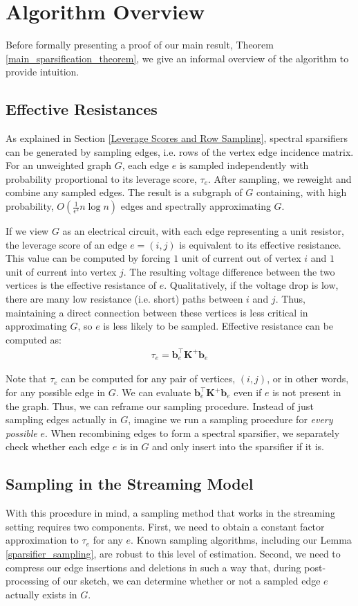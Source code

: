 \documentclass[11pt]{article}
\newcommand{\bv}[1]{\mathbf{#1}}
\begin{document}
\section{Algorithm Overview}\label{algorithm_overview}
Before formally presenting a proof of our main result, Theorem \ref{main_sparsification_theorem}, we give an informal overview of the algorithm to provide intuition. 

\subsection{Effective Resistances}
As explained in Section \ref{Leverage Scores and Row Sampling}, spectral sparsifiers can be generated by sampling edges, i.e. rows of the vertex edge incidence matrix. For an unweighted graph $G$, each edge $e$ is sampled independently with probability proportional to its leverage score, $\tau_e$. After sampling, we reweight and combine any sampled edges. The result is a subgraph of $G$ containing, with high probability, $O(\frac1{\epsilon^2}n\log n)$ edges and spectrally approximating $G$.

If we view $G$ as an electrical circuit, with each edge representing a unit resistor, the leverage score of an edge $e=(i,j)$ is equivalent  to its effective resistance. This value can be computed by forcing $1$ unit of current out of vertex $i$ and $1$ unit of current into vertex $j$. The resulting voltage difference between the two vertices is the effective resistance of $e$. Qualitatively, if the voltage drop is low, there are many low resistance (i.e. short) paths between $i$ and $j$. Thus, maintaining a direct connection between these vertices is less critical in approximating $G$, so $e$ is less likely to be sampled.
Effective resistance can be computed as:
\begin{align*}
\tau_e = \bv{b}_e^\top \bv{K}^+\bv{b}_e
\end{align*}


Note that $\tau_e$ can be computed for any pair of vertices, $(i,j)$, or in other words, for any possible edge in $G$. We can evaluate  $\bv{b}_e^\top \bv{K}^+\bv{b}_e$ even if $e$ is not present in the graph. Thus, we can reframe our sampling procedure. Instead of just sampling edges actually in $G$, imagine we run a sampling procedure for \emph{every possible} $e$. When recombining edges to form a spectral sparsifier, we separately check whether each edge $e$ is in $G$ and only insert into the sparsifier if it is. 
\subsection{Sampling in the Streaming Model}
With this procedure in mind, a sampling method that works in the streaming setting requires two components. First, we need to obtain a constant factor approximation to $\tau_e$ for any $e$. Known sampling algorithms, including our Lemma \ref{sparsifier_sampling}, are robust to this level of estimation. Second, we need to compress our edge insertions and deletions in such a way that, during post-processing of our sketch, we can determine whether or not a sampled edge $e$ actually exists in $G$. 
\end{document}
